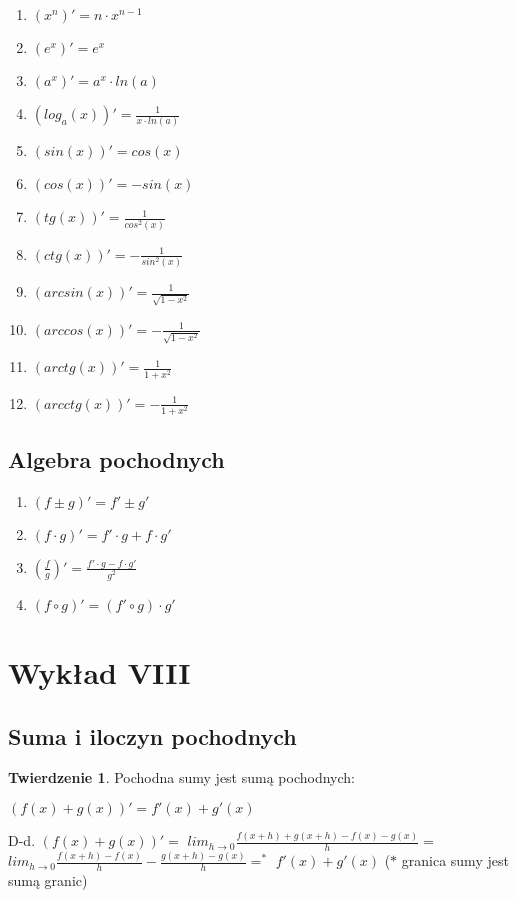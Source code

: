 \documentclass{article}
\theoremstyle{definition}
\theoremstyle{definition}
\newtheorem{tw}{Twierdzenie}[subsection]
\theoremstyle{definition}
\theoremstyle{definition}
\begin{document}
\begin{enumerate}
    \item $(x^n)'=n\cdot x^{n-1}$
    \item $(e^x)'=e^x$
    \item $(a^x)'=a^x\cdot ln(a)$
    \item $(log_a(x))'=\frac{1}{x\cdot ln(a)}$
    \item $(sin(x))'=cos(x)$
    \item $(cos(x))'=-sin(x)$
    \item $(tg(x))'=\frac{1}{cos^2(x)}$
    \item $(ctg(x))'=-\frac{1}{sin^2(x)}$
    \item $(arcsin(x))'=\frac{1}{\sqrt{1-x^2}}$
    \item $(arccos(x))'=-\frac{1}{\sqrt{1-x^2}}$
    \item $(arctg(x))'=\frac{1}{1+x^2}$
    \item $(arcctg(x))'=-\frac{1}{1+x^2}$
\end{enumerate}

\subsection{Algebra pochodnych}
\begin{enumerate}
    \item $(f\pm g)'=f'\pm g'$
    \item $(f\cdot g)'=f'\cdot g + f\cdot g'$
    \item $(\frac{f}{g})'=\frac{f'\cdot g - f\cdot g'}{g^2}$
    \item $(f\circ g)'=(f'\circ g)\cdot g'$
\end{enumerate}

\section{Wykład VIII}

\subsection{Suma i iloczyn pochodnych}

\begin{tw}
    Pochodna sumy jest sumą pochodnych:
    \begin{center}
        $(f(x)+g(x))'=f'(x)+g'(x)$
    \end{center}
    D-d.
    $(f(x)+g(x))'=$
    $lim_{h\rightarrow 0} \frac{f(x+h)+g(x+h)-f(x)-g(x)}{h}=$
    $lim_{h\rightarrow 0} \frac{f(x+h)-f(x)}{h} - \frac{g(x+h)-g(x)}{h}=^*$
    $f'(x)+g'(x)$ ($*$ granica sumy jest sumą granic)
\end{tw}
\end{document}
